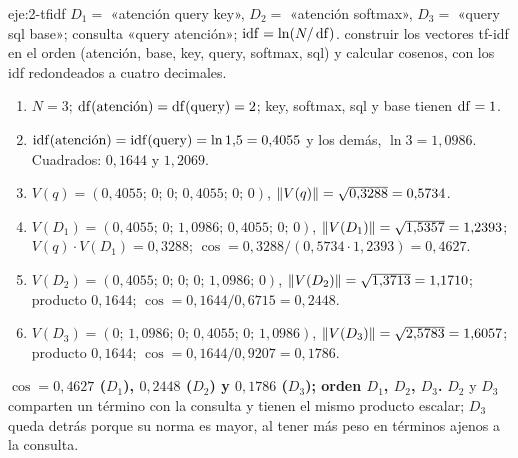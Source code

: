 \begin{solucion}{eje:2-tfidf}
\datos $D_1=$ «atención query key», $D_2=$ «atención softmax», $D_3=$ «query sql base»; consulta «query atención»; $\operatorname{idf}=\ln(N/\operatorname{df})$.
\planteamiento construir los vectores tf-idf en el orden (atención, base, key, query, softmax, sql) y calcular cosenos, con los idf redondeados a cuatro decimales.
\pasos
\begin{enumerate}[label=\arabic*.]
  \item $N=3$; $\operatorname{df}(\text{atención})=\operatorname{df}(\text{query})=2$; key, softmax, sql y base tienen $\operatorname{df}=1$.
  \item $\operatorname{idf}(\text{atención})=\operatorname{idf}(\text{query})=\ln 1{,}5=0{,}4055$ y los demás, $\ln 3=1{,}0986$. Cuadrados: $0{,}1644$ y $1{,}2069$.
  \item $V(q)=(0{,}4055;\,0;\,0;\,0{,}4055;\,0;\,0)$, $\lVert V(q)\rVert=\sqrt{0{,}3288}=0{,}5734$.
  \item $V(D_1)=(0{,}4055;\,0;\,1{,}0986;\,0{,}4055;\,0;\,0)$, $\lVert V(D_1)\rVert=\sqrt{1{,}5357}=1{,}2393$; $V(q)\cdot V(D_1)=0{,}3288$; $\cos=0{,}3288/(0{,}5734\cdot 1{,}2393)=0{,}4627$.
  \item $V(D_2)=(0{,}4055;\,0;\,0;\,0;\,1{,}0986;\,0)$, $\lVert V(D_2)\rVert=\sqrt{1{,}3713}=1{,}1710$; producto $0{,}1644$; $\cos=0{,}1644/0{,}6715=0{,}2448$.
  \item $V(D_3)=(0;\,1{,}0986;\,0;\,0{,}4055;\,0;\,1{,}0986)$, $\lVert V(D_3)\rVert=\sqrt{2{,}5783}=1{,}6057$; producto $0{,}1644$; $\cos=0{,}1644/0{,}9207=0{,}1786$.
\end{enumerate}
\resultado \textbf{$\cos=0{,}4627$ ($D_1$), $0{,}2448$ ($D_2$) y $0{,}1786$ ($D_3$); orden $D_1$, $D_2$, $D_3$.}
\comprobacion $D_2$ y $D_3$ comparten un término con la consulta y tienen el mismo producto escalar; $D_3$ queda detrás porque su norma es mayor, al tener más peso en términos ajenos a la consulta.
\end{solucion}

